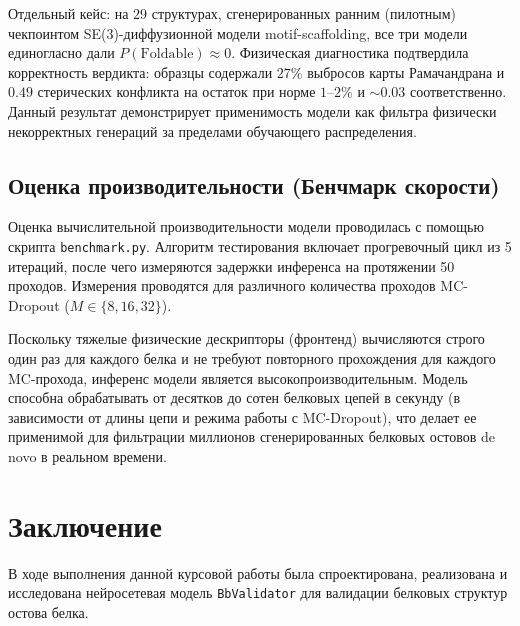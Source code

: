 \documentclass[12pt, a4paper]{article}
\begin{document}
Отдельный кейс: на $29$ структурах, сгенерированных ранним (пилотным) чекпоинтом SE(3)-диффузионной модели motif-scaffolding, все три модели единогласно дали $P(\mathrm{Foldable}) \approx 0$. Физическая диагностика подтвердила корректность вердикта: образцы содержали $27\%$ выбросов карты Рамачандрана и $0.49$ стерических конфликта на остаток при норме $1$--$2\%$ и $\sim 0.03$ соответственно. Данный результат демонстрирует применимость модели как фильтра физически некорректных генераций за пределами обучающего распределения.

\subsection{Оценка производительности (Бенчмарк скорости)}
Оценка вычислительной производительности модели проводилась с помощью скрипта \texttt{benchmark.py}. Алгоритм тестирования включает прогревочный цикл из 5 итераций, после чего измеряются задержки инференса на протяжении 50 проходов. Измерения проводятся для различного количества проходов MC-Dropout ($M \in \{8, 16, 32\}$).

Поскольку тяжелые физические дескрипторы (фронтенд) вычисляются строго один раз для каждого белка и не требуют повторного прохождения для каждого MC-прохода, инференс модели является высокопроизводительным. Модель способна обрабатывать от десятков до сотен белковых цепей в секунду (в зависимости от длины цепи и режима работы с MC-Dropout), что делает ее применимой для фильтрации миллионов сгенерированных белковых остовов de novo в реальном времени.

\newpage

\section{Заключение}
В ходе выполнения данной курсовой работы была спроектирована, реализована и исследована нейросетевая модель \texttt{BbValidator} для валидации белковых структур остова белка. 
\end{document}

